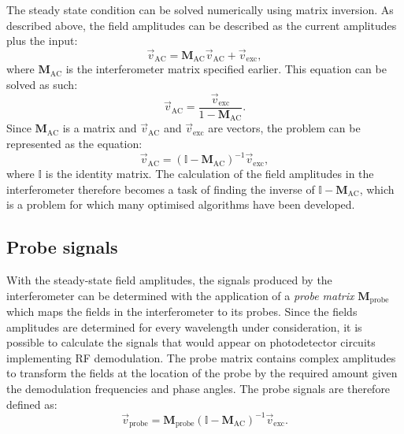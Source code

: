 The steady state condition can be solved numerically using matrix inversion. As described above, the field amplitudes can be described as the current amplitudes plus the input:
\begin{equation}
  \vec{v}_{\text{AC}} = \mathbf{M}_{\text{AC}} \vec{v}_{\text{AC}} + \vec{v}_{\text{exc}},
\end{equation}
where $\mathbf{M}_{\text{AC}}$ is the interferometer matrix specified earlier. This equation can be solved as such:
\begin{equation}
  \vec{v}_{\text{AC}} = \frac{\vec{v}_{\text{exc}}}{1 - \mathbf{M}_{\text{AC}}}.
\end{equation}
Since $\mathbf{M}_{\text{AC}}$ is a matrix and $\vec{v}_{\text{AC}}$ and $\vec{v}_{\text{exc}}$ are vectors, the problem can be represented as the equation:
\begin{equation}
  \vec{v}_{\text{AC}} = \left( \mathbb{I} - \mathbf{M}_{\text{AC}} \right)^{-1} \vec{v}_{\text{exc}},
\end{equation}
where $\mathbb{I}$ is the identity matrix. The calculation of the field amplitudes in the interferometer therefore becomes a task of finding the inverse of $\mathbb{I} - \mathbf{M}_{\text{AC}}$, which is a problem for which many optimised algorithms have been developed.

\subsection{Probe signals}
With the steady-state field amplitudes, the signals produced by the interferometer can be determined with the application of a \emph{probe matrix} $\mathbf{M}_{\text{probe}}$ which maps the fields in the interferometer to its probes. Since the fields amplitudes are determined for every wavelength under consideration, it is possible to calculate the signals that would appear on photodetector circuits implementing \gls{RF} demodulation. The probe matrix contains complex amplitudes to transform the fields at the location of the probe by the required amount given the demodulation frequencies and phase angles. The probe signals are therefore defined as:
\begin{equation}
  \vec{v}_{\text{probe}} = \mathbf{M}_{\text{probe}} \left( \mathbb{I} - \mathbf{M}_{\text{AC}} \right)^{-1} \vec{v}_{\text{exc}}.
\end{equation}

